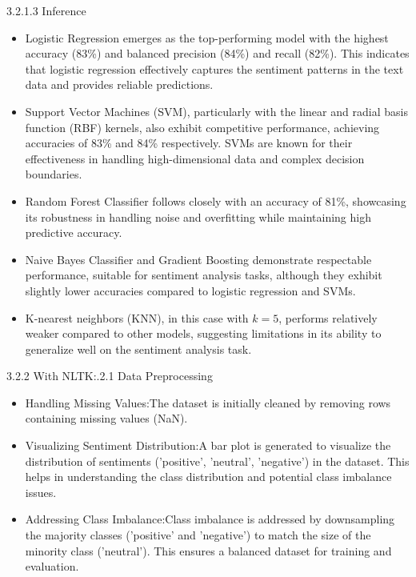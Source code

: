 \documentclass[a4paper]{article}
\theoremstyle{plain}
\theoremstyle{definition}
\begin{document}
3.2.1.3 Inference \newline
\begin{itemize}
    \item Logistic Regression emerges as the top-performing model with the highest accuracy (83\%) and balanced precision (84\%) and recall (82\%). This indicates that logistic regression effectively captures the sentiment patterns in the text data and provides reliable predictions.
    \item Support Vector Machines (SVM), particularly with the linear and radial basis function (RBF) kernels, also exhibit competitive performance, achieving accuracies of 83\% and 84\% respectively. SVMs are known for their effectiveness in handling high-dimensional data and complex decision boundaries.
    \item Random Forest Classifier follows closely with an accuracy of 81\%, showcasing its robustness in handling noise and overfitting while maintaining high predictive accuracy.
    \item Naive Bayes Classifier and Gradient Boosting demonstrate respectable performance, suitable for sentiment analysis tasks, although they exhibit slightly lower accuracies compared to logistic regression and SVMs.
    \item K-nearest neighbors (KNN), in this case with $k = 5$, performs relatively weaker compared to other models, suggesting limitations in its ability to generalize well on the sentiment analysis task.
\end{itemize}
3.2.2 With NLTK:\vspace{0.2 cm}.2.1 Data Preprocessing
\begin{itemize}
    \item {Handling Missing Values}:The dataset is initially cleaned by removing rows containing missing values (NaN).
    \item {Visualizing Sentiment Distribution}:A bar plot is generated to visualize the distribution of sentiments ('positive', 'neutral', 'negative') in the dataset. This helps in understanding the class distribution and potential class imbalance issues.
    \item {Addressing Class Imbalance}:Class imbalance is addressed by downsampling the majority classes ('positive' and 'negative') to match the size of the minority class ('neutral'). This ensures a balanced dataset for training and evaluation.
\end{itemize}
\end{document}
